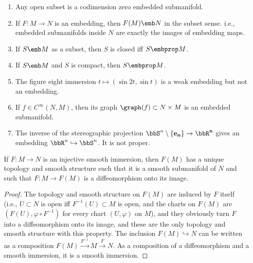 \begin{example}\label{example submanifolds}
\begin{enumerate}
    \item Any open subset is a codimension zero embedded submanifold.
    \item If $F:M\to N$ is an embedding, then $F(M)\emb N$ in the subset sense. i.e., embedded submanifolds inside $N$ are exactly the images of embedding maps.
    \item If $S\emb M$ as a subset, then $S$ is closed iff $S\embprop M$.
    \item If $S\emb M$ and $S$ is compact, then $S\embprop M$.
    \item  The figure eight immersion $t\mapsto (\sin 2t,\sin t)$ is a weak embedding but not an embedding.
    \item If $f\in C^\infty(N,M)$, then its graph $\graph(f)\subset N\times M$ is an embedded submanifold.
    \item The inverse of the stereographic projection $\bbS^n\setminus \{\bf{e}_n\}\to \bbR^n$ gives an embedding $\bbR^n\hookrightarrow \bbS^n$. It is not proper.
\end{enumerate}
\end{example}


\begin{prop}\label{prop 5.18 Lee}
    If $F:M\to N$ is an injective smooth immersion, then $F(M)$ has a unique topology and smooth structure such that it is a smooth submanifold of $N$ and such that $F:M\to F(M)$ is a diffeomorphism onto its image.
\end{prop}
\begin{proof}
    The topology and smooth structure on $F(M)$ are induced by $F$ itself (i.e., $U\subset N$ is open iff $F^{-1}(U)\subset M$ is open, and the charts on $F(M)$ are $(F(U),\varphi\circ F^{-1})$ for every chart $(U,\varphi)$ on $M$), and they obviously turn $F$ into a diffeomorphism onto its image, and these are the only topology and smooth structure with this property. The inclusion $F(M)\hookrightarrow N$ can be written as a composition $F(M)\overset{F^{-1}}{\to}M\overset{F}{\to}N$. As a composition of a diffeomorphism and a smooth immersion, it is a smooth immersion.
\end{proof}


